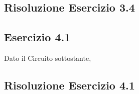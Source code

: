 \documentclass[\main/main.tex]{subfiles}
\begin{document}
\clearpage
\subsection{Risoluzione Esercizio 3.4}
\clearpage
\subsection{Esercizio 4.1}
Dato il Circuito sottostante,

\clearpage
\subsection{Risoluzione Esercizio 4.1}
\end{document}
